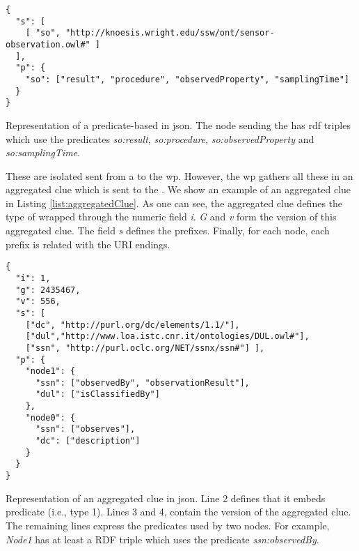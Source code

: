 \begin{listing}
  \begin{verbatim}
{
  "s": [
    [ "so", "http://knoesis.wright.edu/ssw/ont/sensor-observation.owl#" ]
  ],
  "p": {
    "so": ["result", "procedure", "observedProperty", "samplingTime"]
  }
}
  \end{verbatim}
  \label{list:oneClue}
  \caption[Representation of a predicate-based \clue{}]{
    Representation of a predicate-based \clue{} in \acs{json}.
    The node sending the \clue{} has \acs{rdf} triples which use the predicates
    \emph{so:result}, \emph{so:procedure}, \emph{so:observedProperty} and \emph{so:samplingTime}.
  }
\end{listing}

\medskip

These are isolated \clues{} sent from a \provider{} to the \ac{wp}.
However, the \ac{wp} gathers all these \clues{} in an aggregated clue which is sent to the \consumer{}.
We show an example of an aggregated clue in Listing \ref{list:aggregatedClue}.
As one can see, the aggregated clue defines the type of \clues{} wrapped through the numeric field \emph{i}.
\emph{G} and \emph{v} form the version of this aggregated clue.
The field \emph{s} defines the prefixes.
Finally, for each node, each prefix is related with the URI endings.

\begin{listing}
  \begin{verbatim}
{
  "i": 1,
  "g": 2435467,
  "v": 556,
  "s": [
    ["dc", "http://purl.org/dc/elements/1.1/"],
    ["dul","http://www.loa.istc.cnr.it/ontologies/DUL.owl#"],
    ["ssn", "http://purl.oclc.org/NET/ssnx/ssn#"] ],
  "p": {
    "node1": {
      "ssn": ["observedBy", "observationResult"],
      "dul": ["isClassifiedBy"]
    },
    "node0": {
      "ssn": ["observes"],
      "dc": ["description"]
    }
  }
}
  \end{verbatim}
  \caption[Representation of an aggregated \clue{}]{
    Representation of an aggregated clue in \ac{json}.
    Line 2 defines that it embeds predicate \clues{} (i.e., type 1).
    Lines 3 and 4, contain the version of the aggregated clue.
    The remaining lines express the predicates used by two nodes.
    For example, \emph{Node1} has at least a RDF triple which uses the predicate \emph{ssn:observedBy}.
  }
  \label{list:aggregatedClue}
\end{listing}


